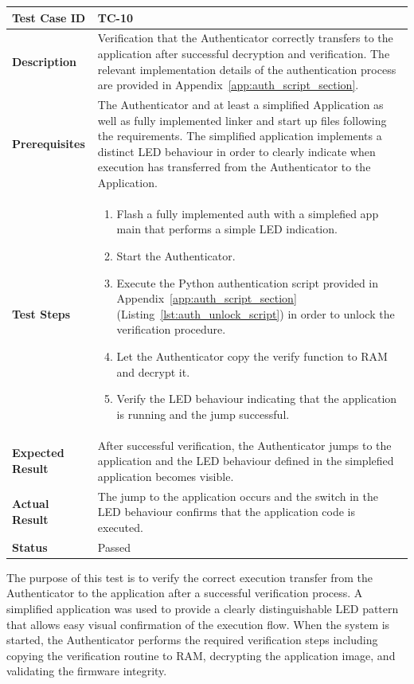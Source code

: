 \begin{table}[H]
\centering
\begin{tabular}{|p{}|p{}|}
\hline
\textbf{Test Case ID} & TC-10 \\ \hline
\textbf{Description} & Verification that the Authenticator correctly transfers to the application after successful decryption and verification. The relevant implementation details of the authentication process are provided in Appendix~\ref{app:auth_script_section}. \\ \hline
\textbf{Prerequisites} & The Authenticator and at least a simplified Application as well as fully implemented linker and start up files following the requirements. The simplified application implements a distinct LED behaviour in order to clearly indicate when execution has transferred from the Authenticator to the Application. \\ \hline
\textbf{Test Steps} &
\begin{enumerate}
\item Flash a fully implemented auth with a simplefied app main that performs a simple LED indication.
\item Start the Authenticator.
\item Execute the Python authentication script provided in Appendix~\ref{app:auth_script_section} (Listing~\ref{lst:auth_unlock_script}) in order to unlock the verification procedure.
\item Let the Authenticator copy the verify function to RAM and decrypt it.
\item Verify the LED behaviour indicating that the application is running and the jump successful.
\end{enumerate}
\\ \hline
\textbf{Expected Result} & After successful verification, the Authenticator jumps to the application and the LED behaviour defined in the simplefied application becomes visible. \\ \hline
\textbf{Actual Result} & The jump to the application occurs and the switch in the LED behaviour confirms that the application code is executed. \\ \hline
\textbf{Status} & \textcolor{green!60!black}{Passed} \\ \hline
\end{tabular}
\end{table}

The purpose of this test is to verify the correct execution transfer from the Authenticator to the application after a successful verification process. A simplified application was used to provide a clearly distinguishable LED pattern that allows easy visual confirmation of the execution flow. When the system is started, the Authenticator performs the required verification steps including copying the verification routine to RAM, decrypting the application image, and validating the firmware integrity.

